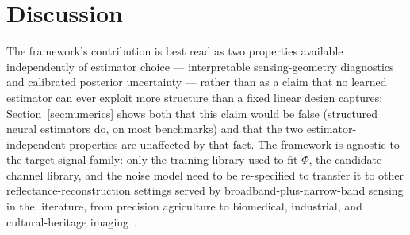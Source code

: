 \documentclass[11pt]{article}
\begin{document}
\section{Discussion}
\label{sec:discussion}

The framework's contribution is best read as two properties available independently of estimator choice --- interpretable sensing-geometry diagnostics and calibrated posterior uncertainty --- rather than as a claim that no learned estimator can ever exploit more structure than a fixed linear design captures; Section~\ref{sec:numerics} shows both that this claim would be false (structured neural estimators do, on most benchmarks) and that the two estimator-independent properties are unaffected by that fact. The framework is agnostic to the target signal family: only the training library used to fit $\Phi$, the candidate channel library, and the noise model need to be re-specified to transfer it to other reflectance-reconstruction settings served by broadband-plus-narrow-band sensing in the literature, from precision agriculture to biomedical, industrial, and cultural-heritage imaging~\citep{ref19,ref20,ref21,ref22,ref23}.
\end{document}
